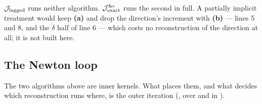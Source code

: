 \noindent
$\mathcal{J}_{\mathrm{lagged}}$ runs neither algorithm. $\mathcal{J}^{\mathrm{ho}}_{\mathrm{exact}}$ runs the second in full. A partially implicit treatment
would keep \textbf{(a)} and drop the direction's increment with \textbf{(b)} --- lines 5 and 8,
and the $\dot{\delta}$ half of line 6 --- which costs no reconstruction of the direction at all;
it is not built here.

\subsection{The Newton loop}
\label{sec:schemes:newton}

The two algorithms above are inner kernels. What places them, and what decides which
reconstruction runs where, is the outer iteration
(, over  and
 in ).

